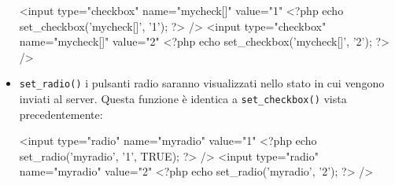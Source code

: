 \begin{itemize}
\begin{code}
<input type="checkbox" name="mycheck[]" value="1" <?php echo set_checkbox('mycheck[]', '1'); ?> />
<input type="checkbox" name="mycheck[]" value="2" <?php echo set_checkbox('mycheck[]', '2'); ?> />
\end{code}

\item \verb|set_radio()| i pulsanti radio saranno visualizzati nello stato in cui vengono inviati al server. Questa funzione è identica a \verb|set_checkbox()| vista precedentemente:

\begin{code}
<input type="radio" name="myradio" value="1" <?php echo set_radio('myradio', '1', TRUE); ?> />
<input type="radio" name="myradio" value="2" <?php echo set_radio('myradio', '2'); ?> />
\end{code}
\end{itemize}